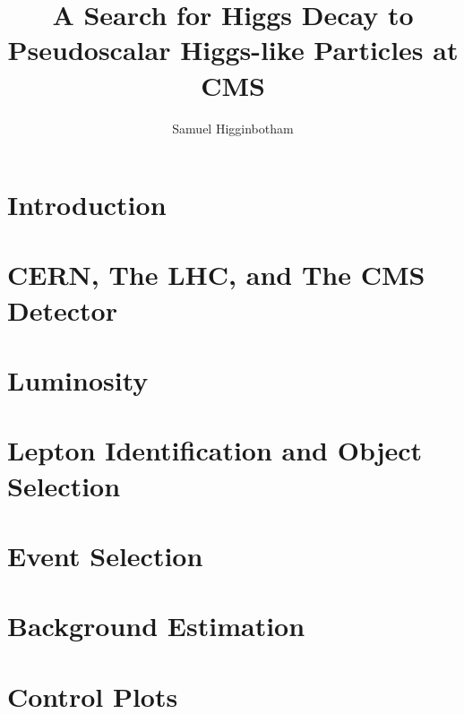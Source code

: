 \documentclass[phd,black]{PrincetonThesis}
\title{A Search for Higgs Decay to Pseudoscalar Higgs-like Particles at CMS}
\author{Samuel Higginbotham}
\begin{document}
\begin{frontmatter}
  \begin{thesisabstract}
    
  \end{thesisabstract}
  \begin{acknowledgements}
    
  \end{acknowledgements}
\end{frontmatter}
\graphicspath{{/mnt/c/Users/Sam Higginbotham/Dropbox/HAA/}{/mnt/c/Users/Sam Higginbotham/Dropbox/HAA/plots/}{/mnt/c/Users/Sam Higginbotham/Dropbox/HAA/paper/AN-20-208/}{/mnt/c/Users/Sam Higginbotham/Dropbox/MyPhD/figures}}



\chapter{Introduction}
\label{chap:Introduction}


\chapter{CERN, The LHC, and The CMS Detector}
\label{chap:cmsdet}


\chapter{Luminosity}
\label{chap:lumi}


\chapter{Lepton Identification and Object Selection}
\label{chap:samples}


\chapter{Event Selection}
\label{chap:selection}


\chapter{Background Estimation}
\label{chap:background}


\chapter{Control Plots}
\label{chap:plots}

\end{document}
